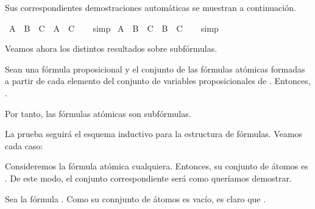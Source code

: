 \begin{isabellebody}
{\isafoldproof}%
%
\isadelimproof
%
\endisadelimproof
%
\begin{isamarkuptext}%
Sus correspondientes demostraciones automáticas se muestran a 
  continuación.%
\end{isamarkuptext}\isamarkuptrue%
\isamarkupfalse%
\ {\isachardoublequoteopen}A\ {\isasymunion}\ B\ {\isasymsubseteq}\ C\ {\isasymLongrightarrow}\ A\ {\isasymsubseteq}\ C{\isachardoublequoteclose}\isanewline
%
\isadelimproof
\ \ %
\endisadelimproof
%
\isatagproof
{}\isamarkupfalse%
\ simp%
\endisatagproof
{\isafoldproof}%
%
\isadelimproof
\isanewline
%
\endisadelimproof
\isanewline
{}\isamarkupfalse%
\ {\isachardoublequoteopen}A\ {\isasymunion}\ B\ {\isasymsubseteq}\ C\ {\isasymLongrightarrow}\ B\ {\isasymsubseteq}\ C{\isachardoublequoteclose}\isanewline
%
\isadelimproof
\ \ %
\endisadelimproof
%
\isatagproof
{}\isamarkupfalse%
\ simp%
\endisatagproof
{\isafoldproof}%
%
\isadelimproof
%
\endisadelimproof
%
\begin{isamarkuptext}%
Veamos ahora los distintos resultados sobre subfórmulas.


  \begin{lema}
    Sean  una fórmula proposicional y  el conjunto de las 
    fórmulas atómicas formadas a partir de cada elemento del conjunto 
    de variables proposicionales de . 
    Entonces, .

    Por tanto, las fórmulas atómicas son subfórmulas.
  \end{lema}

  \begin{demostracion}
    La prueba seguirá el esquema inductivo para la estructura de 
    fórmulas. Veamos cada caso:
  
    Consideremos la fórmula atómica  cualquiera. Entonces, su
    conjunto de átomos es . De este modo, el conjunto  
    correspondiente será  como 
    queríamos 
    demostrar.

    Sea la fórmula \isa{{\isasymbottom}}. Como su connjunto de átomos es vacío, es claro 
    que .


\end{demostracion}
\end{isamarkuptext}
\end{isabellebody}
